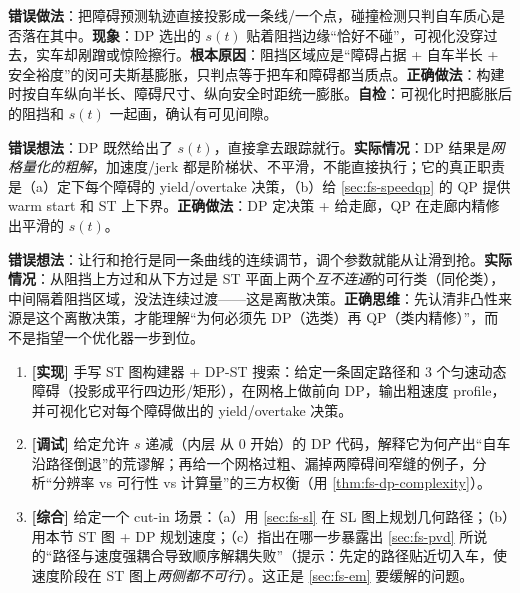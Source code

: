 \begin{pitfall}
\textbf{错误做法}：把障碍预测轨迹直接投影成一条线/一个点，碰撞检测只判自车质心是否落在其中。\textbf{现象}：DP 选出的 $s(t)$ 贴着阻挡边缘“恰好不碰”，可视化没穿过去，实车却剐蹭或惊险擦行。\textbf{根本原因}：阻挡区域应是“障碍占据 + 自车半长 + 安全裕度”的闵可夫斯基膨胀，只判点等于把车和障碍都当质点。\textbf{正确做法}：构建 \verb@STBoundary@ 时按自车纵向半长、障碍尺寸、纵向安全时距统一膨胀。\textbf{自检}：可视化时把膨胀后的阻挡和 $s(t)$ 一起画，确认有可见间隙。
\end{pitfall}

\begin{pitfall}
\textbf{错误想法}：DP 既然给出了 $s(t)$，直接拿去跟踪就行。\textbf{实际情况}：DP 结果是\emph{网格量化的粗解}，加速度/jerk 都是阶梯状、不平滑，不能直接执行；它的真正职责是（a）定下每个障碍的 yield/overtake 决策，（b）给 \cref{sec:fs-speedqp} 的 QP 提供 warm start 和 ST 上下界。\textbf{正确做法}：DP 定决策 + 给走廊，QP 在走廊内精修出平滑的 $s(t)$。
\end{pitfall}

\begin{pitfall}
\textbf{错误想法}：让行和抢行是同一条曲线的连续调节，调个参数就能从让滑到抢。\textbf{实际情况}：从阻挡上方过和从下方过是 ST 平面上两个\emph{互不连通}的可行类（同伦类），中间隔着阻挡区域，没法连续过渡——这是离散决策。\textbf{正确思维}：先认清非凸性来源是这个离散决策，才能理解“为何必须先 DP（选类）再 QP（类内精修）”，而不是指望一个优化器一步到位。
\end{pitfall}

\begin{practice}
\begin{enumerate}
  \item \textbf{[实现]} 手写 ST 图构建器 + DP-ST 搜索：给定一条固定路径和 $3$ 个匀速动态障碍（投影成平行四边形/矩形），在网格上做前向 DP，输出粗速度 profile，并可视化它对每个障碍做出的 yield/overtake 决策。
  \item \textbf{[调试]} 给定允许 $s$ 递减（内层 \verb@sk@ 从 $0$ 开始）的 DP 代码，解释它为何产出“自车沿路径倒退”的荒谬解；再给一个网格过粗、漏掉两障碍间窄缝的例子，分析“分辨率 vs 可行性 vs 计算量”的三方权衡（用 \cref{thm:fs-dp-complexity}）。
  \item \textbf{[综合]} 给定一个 cut-in 场景：（a）用 \cref{sec:fs-sl} 在 SL 图上规划几何路径；（b）用本节 ST 图 + DP 规划速度；（c）指出在哪一步暴露出 \cref{sec:fs-pvd} 所说的“路径与速度强耦合导致顺序解耦失败”（提示：先定的路径贴近切入车，使速度阶段在 ST 图上\emph{两侧都不可行}）。这正是 \cref{sec:fs-em} 要缓解的问题。
\end{enumerate}
\end{practice}

